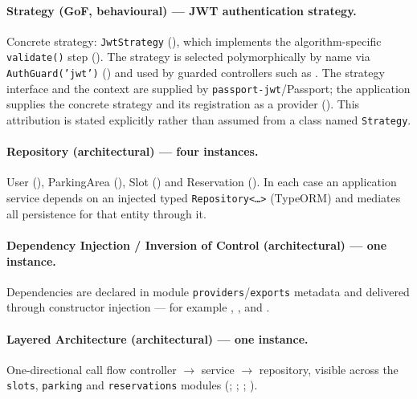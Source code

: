 \documentclass[11pt,a4paper]{article}
\begin{document}
\paragraph{Strategy (GoF, behavioural) --- JWT authentication strategy.}
\begin{sloppypar}
Concrete strategy: \texttt{JwtStrategy}
(), which implements the
algorithm-specific \texttt{validate()} step
(). The strategy is selected
polymorphically by name via \texttt{AuthGuard('jwt')}
() and used by guarded controllers such
as . The strategy interface and the
context are supplied by \texttt{passport-jwt}/Passport; the application supplies
the concrete strategy and its registration as a provider
(). This attribution is stated explicitly rather
than assumed from a class named \texttt{Strategy}.
\end{sloppypar}

\paragraph{Repository (architectural) --- four instances.}
\begin{sloppypar}
User (), ParkingArea
(), Slot
() and Reservation
(). In each case an
application service depends on an injected typed
\texttt{Repository<\ldots>} (TypeORM) and mediates all persistence for that
entity through it.
\end{sloppypar}

\paragraph{Dependency Injection / Inversion of Control (architectural) --- one
instance.}
\begin{sloppypar}
Dependencies are declared in module \texttt{providers}/\texttt{exports}
metadata and delivered through constructor injection --- for example
, ,
 and .
\end{sloppypar}

\paragraph{Layered Architecture (architectural) --- one instance.}
\begin{sloppypar}
One-directional call flow
controller $\rightarrow$ service $\rightarrow$ repository, visible across the
\texttt{slots}, \texttt{parking} and \texttt{reservations} modules
(;
;
;
).
\end{sloppypar}
\end{document}

